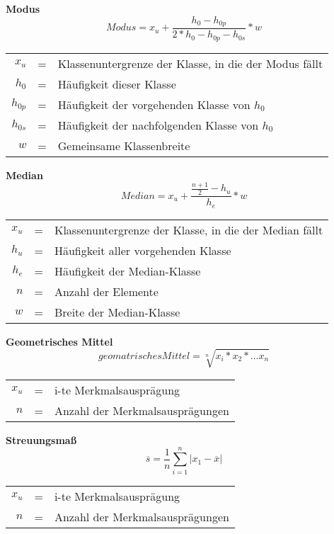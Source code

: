 \documentclass[11pt,twocolumn,fleqn]{article}
\begin{document}
\textbf{Modus}
\begin{equation*}
Modus = x_u + \frac{h_0-h_{0p}}{2* h_0-h_{0p}-h_{0s}} * w
\end{equation*}
\begin{center}\begin{tabular}{rcl}
   $x_u$ & = & Klassenuntergrenze der Klasse, in die der Modus fällt  \\
   $h_0$ & = & Häufigkeit dieser Klasse \\
   $h_{0p}$ & = & Häufigkeit der vorgehenden Klasse von $h_0$  \\
   $h_{0s}$ & = & Häufigkeit der nachfolgenden Klasse von $h_0$ \\
   $w$   & = &  Gemeinsame Klassenbreite \\
\end{tabular}\end{center}


\textbf{Median}
\begin{equation*}
Median = x_u + \frac{ \frac{n+1}{2}-h_u }{h_e} *w
\end{equation*}
\begin{center}\begin{tabular}{rcl}
   $x_u$ & = & Klassenuntergrenze der Klasse, in die der Median fällt  \\
   $h_u$ & = & Häufigkeit aller vorgehenden Klasse \\
   $h_e$ & = & Häufigkeit der Median-Klasse \\
   $n$   & = & Anzahl der Elemente \\
   $w$   & = &  Breite der Median-Klasse \\
\end{tabular}\end{center}


\textbf{Geometrisches Mittel}
\begin{equation*}
geomatrisches Mittel = \sqrt[n]{x_i*x_2*...x_n}
\end{equation*}
\begin{center}\begin{tabular}{rcl}
   $x_u$ & = & i-te Merkmalsausprägung  \\
   $n$   & = & Anzahl der Merkmalsausprägungen \\
\end{tabular}\end{center}

\textbf{Streuungsmaß}
\begin{equation*}
\overline{s}=\frac{1}{n}\sum^n_{i=1}|x_1-\overline{x}|
\end{equation*}
\begin{center}\begin{tabular}{rcl}
   $x_u$ & = & i-te Merkmalsausprägung  \\
   $n$   & = & Anzahl der Merkmalsausprägungen \\
\end{tabular}\end{center}
\end{document}
